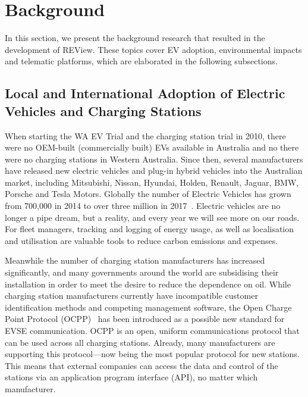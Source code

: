 \section{Background}
\label{sec:9:bg}
In this section, we present the background research that resulted in the development of REView. These topics cover EV adoption, environmental impacts and telematic platforms, which are elaborated in the following subsections.

\subsection{Local and International Adoption of Electric Vehicles and Charging Stations}
When starting the WA EV Trial and the charging station trial in 2010, there were no OEM-built (commercially built) EVs available in Australia and no there were no charging stations in Western Australia. Since then, several manufacturers have released new electric vehicles and plug-in hybrid vehicles into the Australian market, including Mitsubishi, Nissan, Hyundai, Holden, Renault, Jaguar, BMW, Porsche and Tesla Motors. Globally the number of Electric Vehicles has grown from 700,000 in 2014 to over three million in 2017~\cite{international_energy_agency_global_2018}. Electric vehicles are no longer a pipe dream, but a reality, and every year we will see more on our roads. For fleet managers, tracking and logging of energy usage, as well as localisation and utilisation are valuable tools to reduce carbon emissions and expenses.

Meanwhile the number of charging station manufacturers has increased significantly, and many governments around the world are subsidising their installation in order to meet the desire to reduce the dependence on oil. While charging station manufacturers currently have incompatible customer identification methods and competing management software, the Open Charge Point Protocol (OCPP)~\cite{a._rodriguez-serrano_communication_2013} has been introduced as a possible new standard for EVSE communication. OCPP is an open, uniform communications protocol that can be used across all charging stations. Already, many manufacturers are supporting this protocol---now being the most popular protocol for new stations. This means that external companies can access the data and control of the stations via an application program interface (API), no matter which manufacturer.


